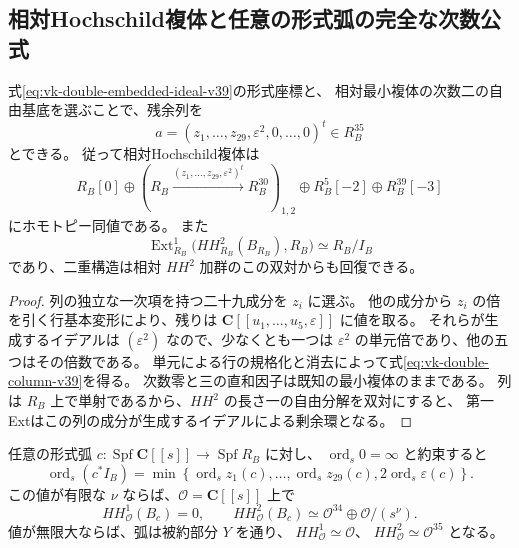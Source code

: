 \subsection{相対Hochschild複体と任意の形式弧の完全な次数公式}

\begin{corollary}[残余列の埋込正規形]
\label{cor:vk-relative-column-normal-form-v39}
式\eqref{eq:vk-double-embedded-ideal-v39}の形式座標と、
相対最小複体の次数二の自由基底を選ぶことで、残余列を
\begin{equation}
 a=(z_1,\ldots,z_{29},\varepsilon^2,0,\ldots,0)^t\in R_B^{35}
 \label{eq:vk-double-column-v39}
\end{equation}
とできる。
従って相対Hochschild複体は
\[
 R_B[0]\oplus
 \left(R_B\xrightarrow{(z_1,\ldots,z_{29},\varepsilon^2)^t}
                    R_B^{30}\right)_{1,2}
 \oplus R_B^5[-2]\oplus R_B^{39}[-3]
\]
にホモトピー同値である。
また
\[
 \operatorname{Ext}_{R_B}^1
       \bigl(HH^2_{R_B}(B_{R_B}),R_B\bigr)
       \simeq R_B/I_B
\]
であり、二重構造は相対 $HH^2$ 加群のこの双対からも回復できる。
\end{corollary}

\begin{proof}
列の独立な一次項を持つ二十九成分を $z_i$ に選ぶ。
他の成分から $z_i$ の倍を引く行基本変形により、残りは
$\mathbf C[[u_1,\ldots,u_5,\varepsilon]]$ に値を取る。
それらが生成するイデアルは $(\varepsilon^2)$ なので、少なくとも一つは
$\varepsilon^2$ の単元倍であり、他の五つはその倍数である。
単元による行の規格化と消去によって式\eqref{eq:vk-double-column-v39}を得る。
次数零と三の直和因子は既知の最小複体のままである。
列は $R_B$ 上で単射であるから、$HH^2$ の長さ一の自由分解を双対にすると、
第一Extはこの列の成分が生成するイデアルによる剰余環となる。
\end{proof}

\begin{corollary}[全次数の接触次数]
\label{cor:vk-contact-order-exact-v39}
任意の形式弧 $c:\operatorname{Spf}\mathbf C[[s]]\to\operatorname{Spf}R_B$ に対し、
$\operatorname{ord}_s0=\infty$ と約束すると
\begin{equation}
 \operatorname{ord}_s(c^*I_B)
  =\min\left\{
      \operatorname{ord}_s z_1(c),\ldots,
      \operatorname{ord}_s z_{29}(c),
      2\operatorname{ord}_s\varepsilon(c)
          \right\}.
 \label{eq:vk-contact-order-formula-v39}
\end{equation}
この値が有限な $\nu$ ならば、$\mathcal O=\mathbf C[[s]]$ 上で
\[
 HH^1_{\mathcal O}(B_c)=0,
 \qquad HH^2_{\mathcal O}(B_c)
       \simeq\mathcal O^{34}\oplus\mathcal O/(s^\nu).
\]
値が無限大ならば、弧は被約部分 $Y$ を通り、
$HH^1_{\mathcal O}\simeq\mathcal O$、
$HH^2_{\mathcal O}\simeq\mathcal O^{35}$ となる。
\end{corollary}

